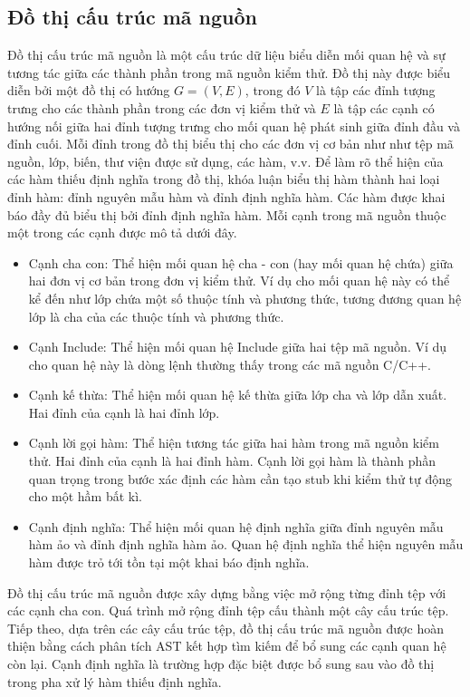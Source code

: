 \subsection*{Đồ thị cấu trúc mã nguồn}
Đồ thị cấu trúc mã nguồn là một cấu trúc dữ liệu biểu diễn mối quan hệ và sự tương tác giữa các thành phần trong mã nguồn kiểm thử. Đồ thị này được biểu diễn bởi một đồ thị có hướng $G = (V, E)$, trong đó $V$ là tập các đỉnh tượng trưng cho các thành phần trong các đơn vị kiểm thử và $E$ là tập các cạnh có hướng nối giữa hai đỉnh tượng trưng cho mối quan hệ phát sinh giữa đỉnh đầu và đỉnh cuối. Mỗi đỉnh trong đồ thị biểu thị cho các đơn vị cơ bản như như tệp mã nguồn, lớp, biến, thư viện được sử dụng, các hàm, v.v. Để làm rõ thể hiện của các hàm thiếu định nghĩa trong đồ thị, khóa luận biểu thị hàm thành hai loại đỉnh hàm: đỉnh nguyên mẫu hàm và đỉnh định nghĩa hàm. Các hàm được khai báo đầy đủ biểu thị bởi đỉnh định nghĩa hàm. Mỗi cạnh trong mã nguồn thuộc một trong các cạnh được mô tả dưới đây.
\begin{itemize}
    \item Cạnh cha con: Thể hiện mối quan hệ cha - con (hay mối quan hệ chứa) giữa hai đơn vị cơ bản trong đơn vị kiểm thử. Ví dụ cho mối quan hệ này có thể kể đến như lớp chứa một số thuộc tính và phương thức, tương đương quan hệ lớp là cha của các thuộc tính và phương thức.
    \item Cạnh Include: Thể hiện mối quan hệ Include giữa hai tệp mã nguồn. Ví dụ cho quan hệ này là dòng lệnh  thường thấy trong các mã nguồn C/C++.
    \item Cạnh kế thừa: Thể hiện mối quan hệ kế thừa giữa lớp cha và lớp dẫn xuất. Hai đỉnh của cạnh là hai đỉnh lớp.
    \item Cạnh lời gọi hàm: Thể hiện tương tác giữa hai hàm trong mã nguồn kiểm thử. Hai đỉnh của cạnh là hai đỉnh hàm. Cạnh lời gọi hàm là thành phần quan trọng trong bước xác định các hàm cần tạo stub khi kiểm thử tự động cho một hầm bất kì.
    \item Cạnh định nghĩa: Thể hiện mối quan hệ định nghĩa giữa đỉnh nguyên mẫu hàm ảo và đỉnh định nghĩa hàm ảo. Quan hệ định nghĩa thể hiện nguyên mẫu hàm được trỏ tới tồn tại một khai báo định nghĩa.
\end{itemize}

Đồ thị cấu trúc mã nguồn được xây dựng bằng việc mở rộng từng đỉnh tệp với các cạnh cha con. Quá trình mở rộng đỉnh tệp cấu thành một cây cấu trúc tệp. Tiếp theo, dựa trên các cây cấu trúc tệp, đồ thị cấu trúc mã nguồn được hoàn thiện bằng cách phân tích AST kết hợp tìm kiếm để bổ sung các cạnh quan hệ còn lại. Cạnh định nghĩa là trường hợp đặc biệt được bổ sung sau vào đồ thị trong pha xử lý hàm thiếu định nghĩa.

